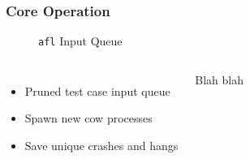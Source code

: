 \begin{frame}
\frametitle{Core Operation}

\begin{figure}
\caption{\texttt{afl} Input Queue}
\begin{center}
{
\scalebox{0.65}{}
}
\end{center}
\end{figure}

\begin{columns}[c]


\begin{itemize}
    \item Pruned test case input queue
    \item Spawn new cow processes
    \item Save unique crashes and hangs
\end{itemize}


Blah blah

\end{columns}
\end{frame}
